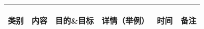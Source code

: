 \begin{longtable}{ X | X | X | X | X | X}

    \hline

    \endfoot
    
    \rowcolor{tabhdcolor}

        \begin{center}
            类别
        \end{center}&
        \begin{center}
            内容
        \end{center}&
        \begin{center}
            目的\&目标
        \end{center}&
        \begin{center}
            详情（举例）
        \end{center}&
        \begin{center}
            时间
        \end{center}&
        \begin{center}
            备注
        \end{center}\\

    \hline

    \endhead


    
\end{longtable}